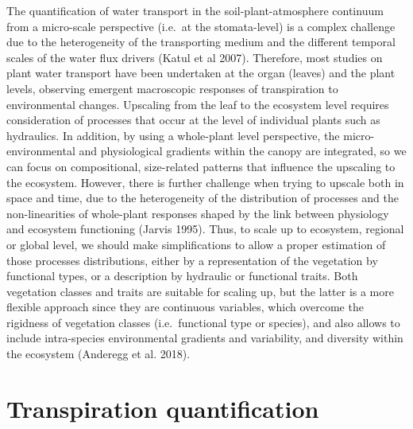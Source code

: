 \documentclass[11pt,twoside]{reedthesis}
\begin{document}
The quantification of water transport in the soil-plant-atmosphere
continuum from a micro-scale perspective (i.e.~at the stomata-level) is
a complex challenge due to the heterogeneity of the transporting medium
and the different temporal scales of the water flux drivers (Katul et al
2007). Therefore, most studies on plant water transport have been
undertaken at the organ (leaves) and the plant levels, observing
emergent macroscopic responses of transpiration to environmental
changes. Upscaling from the leaf to the ecosystem level requires
consideration of processes that occur at the level of individual plants
such as hydraulics. In addition, by using a whole-plant level
perspective, the micro-environmental and physiological gradients within
the canopy are integrated, so we can focus on compositional,
size-related patterns that influence the upscaling to the ecosystem.
However, there is further challenge when trying to upscale both in space
and time, due to the heterogeneity of the distribution of processes and
the non-linearities of whole-plant responses shaped by the link between
physiology and ecosystem functioning (Jarvis 1995). Thus, to scale up to
ecosystem, regional or global level, we should make simplifications to
allow a proper estimation of those processes distributions, either by a
representation of the vegetation by functional types, or a description
by hydraulic or functional traits. Both vegetation classes and traits
are suitable for scaling up, but the latter is a more flexible approach
since they are continuous variables, which overcome the rigidness of
vegetation classes (i.e.~functional type or species), and also allows to
include intra-species environmental gradients and variability, and
diversity within the ecosystem (Anderegg et al. 2018).\par

\section{Transpiration
quantification}\label{transpiration-quantification}
\end{document}
